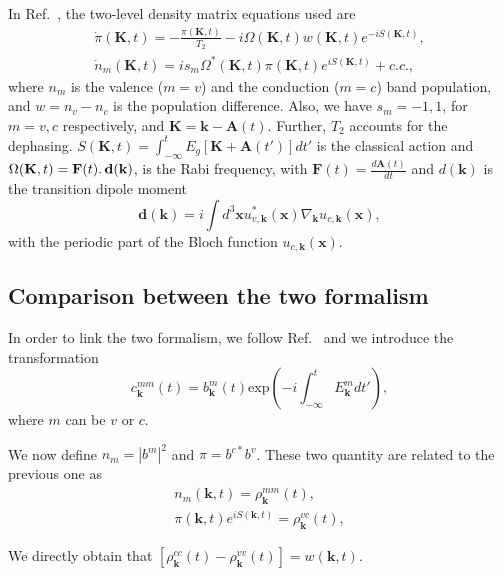 \documentclass[a4paper,11pt]{report}
\renewcommand{\vec}[1]{\mathbf{#1}}
\begin{document}
In Ref.~\cite{PhysRevLett.113.073901}, the two-level density matrix equations used are
\begin{subequations}
 \begin{align}
 \dot{\pi}(\vec{K},t) = -\frac{\pi(\vec{K},t)}{T_2} - i\Omega(\vec{K},t)w(\vec{K},t)e^{-iS(\vec{K},t)}, \\
 \dot{n}_m(\vec{K},t) = is_m\Omega^*(\vec{K},t)\pi(\vec{K},t)e^{iS(\vec{K},t)} + c.c.,
 \end{align}
  \label{eq:twolevel_Corkum}
\end{subequations}
where $n_m$ is the valence ($m=v$) and the conduction ($m=c$) band population, and $w=n_v-n_c$ is the population difference. Also, we have
$s_m=-1,1$, for $m=v,c$ respectively, and $\vec{K}=\vec{k}-\vec{A}(t)$. Further, $T_2$ accounts for the dephasing.
$S(\vec{K},t) = \int_{-\infty}^t E_{g}[\vec{K}+\vec{A}(t')]dt'$ is the classical action and $\Omega(\vec{K},t) = \vec{F}(t)\ldotp\vec{d}(\vec{k})$, is the Rabi frequency, with $\vec{F}(t) = \frac{d\vec{A}(t)}{dt}$ and $d(\vec{k})$ is the transition dipole moment 
\begin{equation}
 \vec{d}(\vec{k}) = i\int d^3\vec{x} u^*_{v,\vec{k}}(\vec{x})\nabla_{\vec{k}}u_{c,\vec{k}}(\vec{x}),
 \label{eq:dipole_Corkum}
\end{equation}
with the periodic part of the Bloch function $u_{c,\vec{k}}(\vec{x})$.

\subsection{Comparison between the two formalism}

In order to link the two formalism, we follow Ref.~\cite{PhysRevLett.113.073901} and we introduce the transformation
\begin{equation}
 c^{mm}_\vec{k}(t) = b^{m}_\vec{k}(t)\mathrm{exp}(-i\int_{-\infty}^t E_{\vec{k}}^m dt'),
\end{equation}
where $m$ can be $v$ or $c$.

We now define $n_m = |b^{m}|^2$ and $\pi = b^{c*} b^{v}$.
These two quantity are related to the previous one as 
\begin{eqnarray}
  n_m(\vec{k},t) = \rho^{mm}_\vec{k}(t), \nonumber\\
  \pi(\vec{k},t)e^{iS(\vec{k},t)} = \rho^{vc}_\vec{k}(t),  \nonumber
\end{eqnarray}

We directly obtain that $\left[\rho^{cc}_\vec{k}(t) - \rho^{vv}_\vec{k}(t)\right] = w(\vec{k},t)$.
\end{document}
